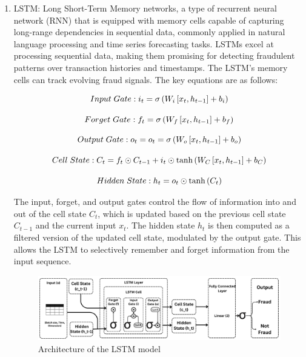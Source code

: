 \documentclass[pdflatex,sn-mathphys-num]{sn-jnl}%
\begin{document}
\begin{enumerate}[label=(\roman*),itemsep=10pt]
\item LSTM: Long Short-Term Memory networks, a type of recurrent neural network (RNN) that is equipped with memory cells capable of capturing long-range dependencies in sequential data, commonly applied in natural language processing and time series forecasting tasks. LSTMs excel at processing sequential data, making them promising for detecting fraudulent patterns over transaction histories and timestamps. The LSTM's memory cells can track evolving fraud signals. The key equations are as follows:

\begin{equation}
Input \hspace{0.1cm} Gate: i_t=\sigma\left(W_i\left[x_t,h_{t-1}\right]+b_i\right)
\end{equation}

\begin{equation}
Forget \hspace{0.1cm} Gate: f_t=\sigma\left(W_f\left[x_t,h_{t-1}\right]+b_f\right)
\end{equation}

\begin{equation}
Output \hspace{0.1cm} Gate: o_t = o_t=\sigma\left(W_o\left[x_t,h_{t-1}\right]+b_o\right) 
\end{equation}

\begin{equation}
Cell \hspace{0.1cm} State: C_t=f_t\odot C_{t-1}+i_t\odot\tanh{\left(W_C\left[x_t,h_{t-1}\right]+b_C\right)}
\end{equation}

\begin{equation}
Hidden \hspace{0.1cm} State: h_t=o_t\odot\tanh{\left(C_t\right)}
\end{equation}

The input, forget, and output gates control the flow of information into and out of the cell state  $C_t$, which is updated based on the previous cell state $C_{t-1}$ and the current input $x_t$. The hidden state $h_t$ is then computed as a filtered version of the updated cell state, modulated by the output gate. This allows the LSTM to selectively remember and forget information from the input sequence.

\clearpage

\begin{figure}[h]
\centering
\includegraphics[width=1.0\textwidth]{LSTM Model Architecture.png}
\caption{Architecture of the LSTM model}\label{fig1}
\end{figure}





\end{enumerate}
\end{document}
